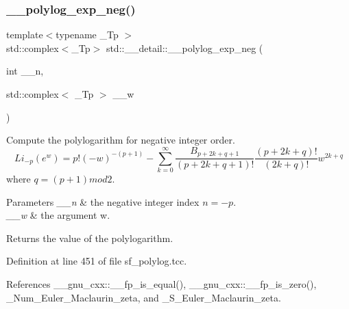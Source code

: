 \mbox{\label{namespacestd_1_1____detail_a313ae48e1c4ed3c5296c8e45614af3d5}} 
\subsubsection{\texorpdfstring{\+\_\+\+\_\+polylog\+\_\+exp\+\_\+neg()}{\_\_polylog\_exp\_neg()}\hspace{0.1cm}{\footnotesize\ttfamily [2/2]}}
{\footnotesize\ttfamily template$<$typename \+\_\+\+Tp $>$ \\
std\+::complex$<$\+\_\+\+Tp$>$ std\+::\+\_\+\+\_\+detail\+::\+\_\+\+\_\+polylog\+\_\+exp\+\_\+neg (\begin{DoxyParamCaption}\item[{int}]{\+\_\+\+\_\+n,  }\item[{std\+::complex$<$ \+\_\+\+Tp $>$}]{\+\_\+\+\_\+w }\end{DoxyParamCaption})}

Compute the polylogarithm for negative integer order. \[ Li_{-p}(e^w) = p!(-w)^{-(p+1)} - \sum_{k=0}^{\infty} \frac{B_{p+2k+q+1}}{(p+2k+q+1)!} \frac{(p+2k+q)!}{(2k+q)!}w^{2k+q} \] where $ q = (p+1) mod 2 $.


\begin{DoxyParams}{Parameters}
{\em \+\_\+\+\_\+n} & the negative integer index $ n = -p $. \\
\hline
{\em \+\_\+\+\_\+w} & the argument w. \\
\hline
\end{DoxyParams}
\begin{DoxyReturn}{Returns}
the value of the polylogarithm. 
\end{DoxyReturn}


Definition at line 451 of file sf\+\_\+polylog.\+tcc.



References \+\_\+\+\_\+gnu\+\_\+cxx\+::\+\_\+\+\_\+fp\+\_\+is\+\_\+equal(), \+\_\+\+\_\+gnu\+\_\+cxx\+::\+\_\+\+\_\+fp\+\_\+is\+\_\+zero(), \+\_\+\+Num\+\_\+\+Euler\+\_\+\+Maclaurin\+\_\+zeta, and \+\_\+\+S\+\_\+\+Euler\+\_\+\+Maclaurin\+\_\+zeta.

\mbox{\label{namespacestd_1_1____detail_a02b154619b2e4d0bf50dc303370d74cd}} 
